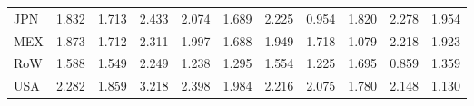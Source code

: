 \begin{table}[htbp]
\begin{tabular}{lcccccccccc}
  JPN & \textcolor[RGB]{97,63,158}{1.832} & \textcolor[RGB]{117,76,138}{1.713} & \textcolor[RGB]{10,7,245}{2.433} & \textcolor[RGB]{46,30,209}{2.074} & \textcolor[RGB]{125,81,130}{1.689} & \textcolor[RGB]{31,20,224}{2.225} & \textcolor[RGB]{232,150,23}{0.954} & \textcolor[RGB]{102,66,153}{1.820} & \textcolor[RGB]{23,15,232}{2.278} & \textcolor[RGB]{71,46,184}{1.954} \\ 
  MEX & \textcolor[RGB]{92,59,163}{1.873} & \textcolor[RGB]{120,78,135}{1.712} & \textcolor[RGB]{18,12,237}{2.311} & \textcolor[RGB]{59,38,196}{1.997} & \textcolor[RGB]{128,82,128}{1.688} & \textcolor[RGB]{77,50,178}{1.949} & \textcolor[RGB]{115,74,140}{1.718} & \textcolor[RGB]{204,132,51}{1.079} & \textcolor[RGB]{33,21,222}{2.218} & \textcolor[RGB]{84,54,171}{1.923} \\ 
  RoW & \textcolor[RGB]{143,92,112}{1.588} & \textcolor[RGB]{156,101,99}{1.549} & \textcolor[RGB]{28,18,227}{2.249} & \textcolor[RGB]{181,117,74}{1.238} & \textcolor[RGB]{176,114,79}{1.295} & \textcolor[RGB]{153,99,102}{1.554} & \textcolor[RGB]{189,122,66}{1.225} & \textcolor[RGB]{122,79,133}{1.695} & \textcolor[RGB]{245,158,10}{0.859} & \textcolor[RGB]{173,112,82}{1.359} \\ 
  USA & \textcolor[RGB]{20,13,235}{2.282} & \textcolor[RGB]{94,61,161}{1.859} & \textcolor[RGB]{3,2,252}{3.218} & \textcolor[RGB]{13,8,242}{2.398} & \textcolor[RGB]{66,43,189}{1.984} & \textcolor[RGB]{36,23,219}{2.216} & \textcolor[RGB]{43,28,212}{2.075} & \textcolor[RGB]{112,73,143}{1.780} & \textcolor[RGB]{41,26,214}{2.148} & \textcolor[RGB]{194,125,61}{1.130} \\ 
   \hline
\end{tabular}
\end{table}
